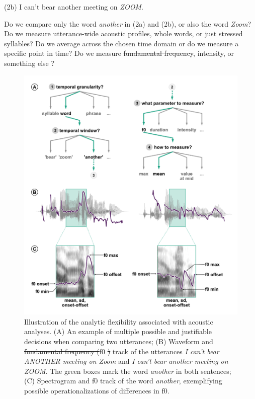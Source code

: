 \documentclass[Review,times,sageh]{sagej}
\providecommand{\DIFaddtex}[1]{{\protect\color{blue}\uwave{#1}}} %
\providecommand{\DIFdeltex}[1]{{\protect\color{red}\sout{#1}}}                      %
\providecommand{\DIFaddbegin}{} %
\providecommand{\DIFaddend}{} %
\providecommand{\DIFdelbegin}{} %
\providecommand{\DIFdelend}{} %
\providecommand{\DIFdelFL}[1]{\DIFdel{#1}} %
\providecommand{\DIFaddbeginFL}{} %
\providecommand{\DIFaddendFL}{} %
\providecommand{\DIFdelbeginFL}{} %
\providecommand{\DIFdelendFL}{} %
\providecommand{\DIFadd}[1]{\texorpdfstring{\DIFaddtex{#1}}{#1}} %
\providecommand{\DIFdel}[1]{\texorpdfstring{\DIFdeltex{#1}}{}} %
\begin{document}
(2b) I can't bear another meeting on \emph{ZOOM}.

\vspace{1em}

\DIFaddbegin \noindent \DIFaddend Do we compare only the word \emph{another} in (2a) and (2b), or also the word \emph{Zoom}?
Do we measure utterance-wide acoustic profiles, whole words, or just stressed syllables?
Do we average across the chosen time domain or do we measure a specific point in time?
Do we measure \DIFdelbegin \DIFdel{fundamental frequency}\DIFdelend \DIFaddbegin \DIFadd{f0}\DIFaddend , intensity, or something else \citep{stevens2000}?



\begin{figure}
\DIFdelbeginFL %
\DIFdelendFL \DIFaddbeginFL \includegraphics[width=1\linewidth]{../figs/ForkingPaths} \DIFaddendFL \caption{Illustration of the analytic flexibility associated with acoustic analyses. (A) An example of multiple possible and justifiable decisions when comparing two utterances; (B) Waveform and \DIFdelbeginFL \DIFdelFL{fundamental frequency (}\DIFdelendFL f0 \DIFdelbeginFL \DIFdelFL{) }\DIFdelendFL track of the utterances \emph{I can't bear ANOTHER meeting on Zoom} and \emph{I can't bear another meeting on ZOOM}. The green boxes mark the word \emph{another} in both sentences; (C) Spectrogram and f0 track of the word \emph{another}, exemplifying possible operationalizations of differences in f0.}\label{fig:forkingPaths}
\end{figure}
\end{document}
